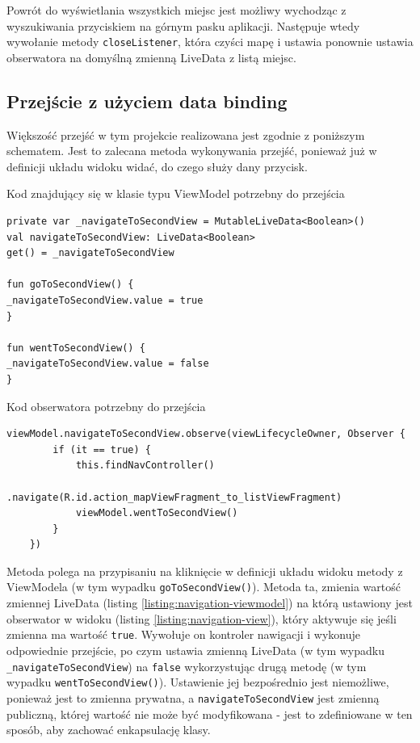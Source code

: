 \documentclass[polish,polish,a4paper,12pt]{article}
\begin{document}
	Powrót do wyświetlania wszystkich miejsc jest możliwy wychodząc z wyszukiwania przyciskiem na górnym pasku aplikacji. Następuje wtedy wywołanie metody \texttt{closeListener}, która czyści mapę i ustawia ponownie ustawia obserwatora na domyślną zmienną LiveData z listą miejsc.

	\subsection{Przejście z użyciem data binding}\label{navigation}

	Większość przejść w tym projekcie realizowana jest zgodnie z poniższym schematem. Jest to zalecana metoda wykonywania przejść, ponieważ już w definicji układu widoku widać, do czego służy dany przycisk.

	\begin{listing}[H]
		\caption{Kod znajdujący się w klasie typu ViewModel potrzebny do przejścia}
		\begin{verbatim}
private var _navigateToSecondView = MutableLiveData<Boolean>()
val navigateToSecondView: LiveData<Boolean>
get() = _navigateToSecondView

fun goToSecondView() {
_navigateToSecondView.value = true
}

fun wentToSecondView() {
_navigateToSecondView.value = false
}
		\end{verbatim}
		\label{listing:navigation-viewmodel}
	\end{listing}

	\begin{listing}[H]
		\caption{Kod obserwatora potrzebny do przejścia}
		\begin{verbatim}
viewModel.navigateToSecondView.observe(viewLifecycleOwner, Observer {
		if (it == true) {
			this.findNavController()
				.navigate(R.id.action_mapViewFragment_to_listViewFragment)
			viewModel.wentToSecondView()
		}
	})
		\end{verbatim}
		\label{listing:navigation-view}
	\end{listing}

	Metoda polega na przypisaniu na kliknięcie w definicji układu widoku metody z ViewModela (w tym wypadku \texttt{goToSecondView()}). Metoda ta, zmienia wartość zmiennej LiveData (listing \ref{listing:navigation-viewmodel}) na którą ustawiony jest obserwator w widoku (listing \ref{listing:navigation-view}), który aktywuje się jeśli zmienna ma wartość \texttt{true}. Wywołuje on kontroler nawigacji i wykonuje odpowiednie przejście, po czym ustawia zmienną LiveData (w tym wypadku \texttt{\_navigateToSecondView}) na \texttt{false} wykorzystując drugą metodę (w tym wypadku \texttt{wentToSecondView()}). Ustawienie jej bezpośrednio jest niemożliwe, ponieważ jest to zmienna prywatna, a \texttt{navigateToSecondView} jest zmienną publiczną, której wartość nie może być modyfikowana - jest to zdefiniowane w ten sposób, aby zachować enkapsulację klasy.
\end{document}
